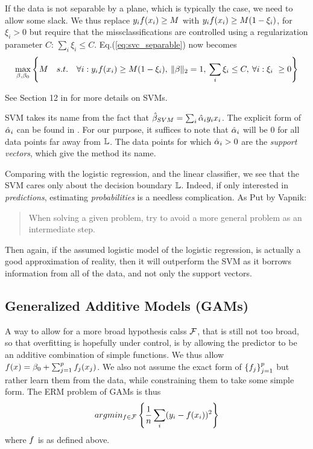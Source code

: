 If the data is not separable by a plane, which is typically the case, we need to allow some slack.
We thus replace $y_i f(x_i) \geq M$ with $y_i f(x_i) \geq M(1-\xi_i)$, for $\xi_i>0$ but require that the missclassifications are controlled using a regularization parameter $C$: $\sum_i \xi_i \leq C$.
Eq.(\ref{eq:svc_separable}) now becomes \citep[Eq.(12.25)]{hastie_elements_2003}
\begin{align}
\label{eq:svc_non_separable}
	\max_{\beta,\beta_0} \left\{  
		M \quad s.t. \quad 
		\forall i: y_i f(x_i) \geq M(1-\xi_i), 
		\: \Vert \beta \Vert_2=1, 
		\: \sum_i \xi_i \leq C,
		\:\forall i:\xi_i\ \geq 0
	 \right\}
\end{align}


See Section 12 in \cite{hastie_elements_2003} for more details on SVMs.


\begin{remark}
SVM takes its name from the fact that $\hat{\beta}_{SVM}=\sum_i \hat{\alpha}_i y_i x_i$.
The explicit form of $\hat{\alpha}_i$ can be found in \citep[Section 12.2.1]{hastie_elements_2003}.
For our purpose, it suffices to note that $\hat{\alpha}_i$ will be $0$ for all data points far away from $\mathbb{L}$.
The data points for which $\hat{\alpha}_i>0$ are the \emph{support vectors}, which give the method its name.
\end{remark}





\begin{remark}
Comparing with the logistic regression, and the linear classifier, we see that the SVM cares only about the decision boundary $\mathbb{L}$. Indeed, if only interested in \emph{predictions}, estimating \emph{probabilities} is a needless complication. As Put by Vapnik: 
\begin{quote}
When solving a given problem, try to avoid a more general problem as an intermediate
step.
\end{quote}
Then again, if the assumed logistic model of the logistic regression, is actually a good approximation of reality, then it will outperform the SVM as it borrows information from all of the data, and not only the support vectors. 
\end{remark}


\subsection{Generalized Additive Models (GAMs)}
\label{sec:gam}
A way to allow for a more broad hypothesis calss $\mathcal{F}$, that is still not too broad, so that overfitting is hopefully under control, is by allowing the predictor to be an additive combination of simple functions.
We thus allow $f(x)=\beta_0 + \sum_{j=1}^p f_j(x_j)$. We also not assume the exact form of $\left\{ f_j \right\}_{j=1}^p$ but rather learn them from the data, while constraining them to take some simple form.
The ERM problem of GAMs is thus
\begin{align}
\label{eq:GAM}
	 argmin_{f \in \mathcal{F}}\left\{ \frac{1}{n}\sum_i (y_i-f(x_i))^2   \right\}
\end{align}
where $f$ is as defined above.

